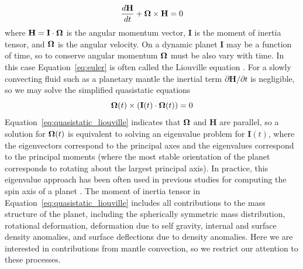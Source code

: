 \documentclass[extra,mreferee]{gji}
\begin{document}
\begin{equation}
\frac{d \mathbf{H}}{dt} + \mitbf{\Omega} \times \mathbf{H} = 0
\label{eq:euler}
\end{equation}
where $\mathbf{H} = \mathbf{I} \cdot \mitbf{\Omega}$ is the angular momentum vector, $\mathbf{I}$ is the moment of inertia tensor, and $\mitbf{\Omega}$ is the angular velocity.
On a dynamic planet $\mathbf{I}$ may be a function of time, so to conserve angular momentum $\mitbf{\Omega}$ must be also vary with time.
In this case Equation~\eqref{eq:euler} is often called the Liouville equation \citep[e.g.][]{munk1960rotation}.
For a slowly convecting fluid such as a planetary mantle the inertial term $\partial \mathbf{H} / \partial t$ is negligible, so we may solve the simplified quasistatic equations
\begin{equation}
\mitbf{\Omega } (t)\times ( \mathbf{I}(t) \cdot \mitbf{\Omega }(t) ) = 0
\label{eq:quasistatic_liouville}
\end{equation}
Equation~\eqref{eq:quasistatic_liouville} indicates that $\mitbf{\Omega}$ and $\mathbf{H}$ are parallel, so a solution for $\mitbf{\Omega}(t)$ is equivalent to solving an eigenvalue problem for $\mathbf{I}(t)$, where the eigenvectors correspond to the principal axes and the eigenvalues correspond to the principal moments (where the most stable orientation of the planet corresponds to rotating about the largest principal axis).
In practice, this eigenvalue approach has been often used in previous studies for computing the spin axis of a planet \citep[e.g.][]{steinberger1997changes, roberts2007cause}.
The moment of inertia tensor in Equation~\eqref{eq:quasistatic_liouville} includes all contributions to the mass structure
of the planet, including the spherically symmetric mass distribution, rotational deformation, deformation due to self gravity, internal and surface density anomalies, and surface deflections due to density anomalies.
Here we are interested in contributions from mantle convection, so we restrict our attention to these processes.
\end{document}
